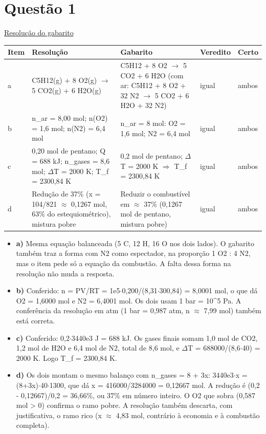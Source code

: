 \documentclass{article}%
\begin{document}
\section*{Questão 1}%
\href{https://poliedroresolve.sistemapoliedro.com.br/vestibulares/ita/2027/ita-2-fase-dia-2-21-10-2026-2-fase-dia-2/dissertativa-1-quimica-2-fase-dia-2-ita-2027}{Resolução do gabarito}\par\smallskip%
\begin{longtable}{@{}p{} p{} p{} p{} p{}@{}}\toprule Item & Resolução & Gabarito & Veredito & Certo \\ \midrule
a & C5H12(g) + 8 O2(g) $\to$ 5 CO2(g) + 6 H2O(g) & C5H12 + 8 O2 $\to$ 5 CO2 + 6 H2O (com ar: C5H12 + 8 O2 + 32 N2 $\to$ 5 CO2 + 6 H2O + 32 N2) & igual & ambos \\
b & n\_ar = 8,00 mol; n(O2) = 1,6 mol; n(N2) = 6,4 mol & n\_ar = 8 mol: O2 = 1,6 mol; N2 = 6,4 mol & igual & ambos \\
c & 0,20 mol de pentano; Q = 688 kJ; n\_gases = 8,6 mol; $\Delta$T = 2000 K; T\_f = 2300,84 K & 0,2 mol de pentano; $\Delta$T = 2000 K $\Rightarrow$ T\_f = 2300,84 K & igual & ambos \\
d & Redução de 37\% (x = 104/821 $\approx$ 0,1267 mol, 63\% do estequiométrico), mistura pobre & Reduzir o combustível em $\approx$ 37\% (0,1267 mol de pentano, mistura pobre) & igual & ambos \\
\bottomrule\end{longtable}%
\begin{itemize}%
\item%
\textbf{a)} Mesma equação balanceada (5 C, 12 H, 16 O nos dois lados). O gabarito também traz a forma com N2 como espectador, na proporção 1 O2 : 4 N2, mas o item pede só a equação da combustão. A falta dessa forma na resolução não muda a resposta.%
\item%
\textbf{b)} Conferido: n = PV/RT = 1e5$\cdot$0,200/(8,31$\cdot$300,84) = 8,0001 mol, o que dá O2 = 1,6000 mol e N2 = 6,4001 mol. Os dois usam 1 bar = 10\^{}5 Pa. A conferência da resolução em atm (1 bar = 0,987 atm, n $\approx$ 7,99 mol) também está correta.%
\item%
\textbf{c)} Conferido: 0,2$\cdot$3440e3 J = 688 kJ. Os gases finais somam 1,0 mol de CO2, 1,2 mol de H2O e 6,4 mol de N2, total de 8,6 mol, e $\Delta$T = 688000/(8,6$\cdot$40) = 2000 K. Logo T\_f = 2300,84 K.%
\item%
\textbf{d)} Os dois montam o mesmo balanço com n\_gases = 8 + 3x: 3440e3$\cdot$x = (8+3x)$\cdot$40$\cdot$1300, que dá x = 416000/3284000 = 0,12667 mol. A redução é (0,2 - 0,12667)/0,2 = 36,66\%, ou 37\% em número inteiro. O O2 que sobra (0,587 mol > 0) confirma o ramo pobre. A resolução também descarta, com justificativa, o ramo rico (x $\approx$ 4,83 mol, contrário à economia e à combustão completa).%
\end{itemize}%
\end{document}
